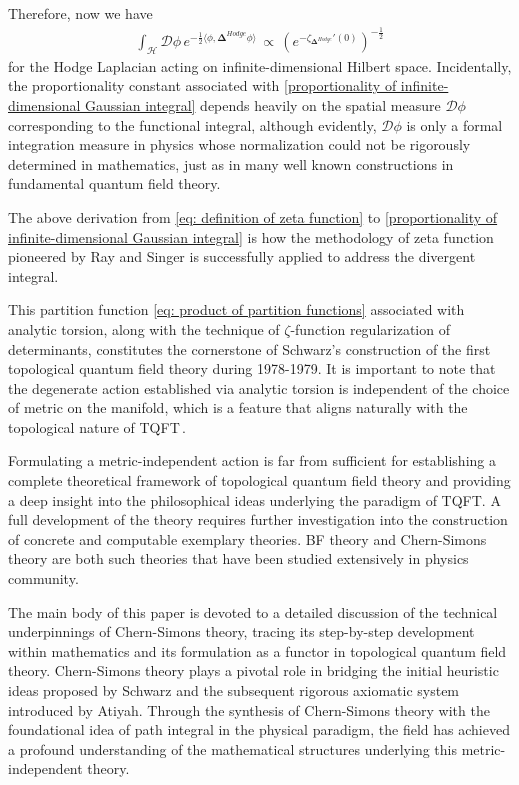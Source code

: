 \par Therefore, now we have 
\begin{equation}\label{proportionality of infinite-dimensional Gaussian integral}
    \begin{split}
        \int_{\mathscr{H}}\mathcal{D}\phi\,e^{-\frac{1}{2}\langle\phi,\mathbf{\Delta}^{Hodge}\phi\rangle}\,\propto\,\left(e^{-\zeta_{\mathbf{\Delta}^{Hodge}}'\left(0\right)}\right)^{-\frac{1}{2}}
    \end{split}
\end{equation}
for the Hodge Laplacian acting on infinite-dimensional Hilbert space. Incidentally, the proportionality constant associated with \eqref{proportionality of infinite-dimensional Gaussian integral} depends heavily on the spatial measure $\mathcal{D}\phi$ corresponding to the functional integral, although evidently, $\mathcal{D}\phi$ is only a formal integration measure in physics whose normalization could not be rigorously determined in mathematics, just as in many well known constructions in fundamental quantum field theory. 
\par The above derivation from \eqref{eq: definition of zeta function} to \eqref{proportionality of infinite-dimensional Gaussian integral} is how the methodology of zeta function pioneered by Ray and Singer is successfully applied to address the divergent integral. 
\par This partition function \eqref{eq: product of partition functions} associated with analytic torsion, along with the technique of $\zeta$-function regularization of determinants, constitutes the cornerstone of Schwarz's construction of the first topological quantum field theory during 1978-1979. It is important to note that the degenerate action established via analytic torsion is independent of the choice of metric on the manifold, which is a feature that aligns naturally with the topological nature of TQFT\,\cite{Schwarz1978}. 
\par Formulating a metric-independent action is far from sufficient for establishing a complete theoretical framework of topological quantum field theory and providing a deep insight into the philosophical ideas underlying the paradigm of TQFT. A full development of the theory requires further investigation into the construction of concrete and computable exemplary theories. BF theory and Chern-Simons theory are both such theories that have been studied extensively in physics community. 
\par The main body of this paper is devoted to a detailed discussion of the technical underpinnings of Chern-Simons theory, tracing its step-by-step development within mathematics and its formulation as a functor in topological quantum field theory. Chern-Simons theory plays a pivotal role in bridging the initial heuristic ideas proposed by Schwarz and the subsequent rigorous axiomatic system introduced by Atiyah. Through the synthesis of Chern-Simons theory with the foundational idea of path integral in the physical paradigm, the field has achieved a profound understanding of the mathematical structures underlying this metric-independent theory. 


